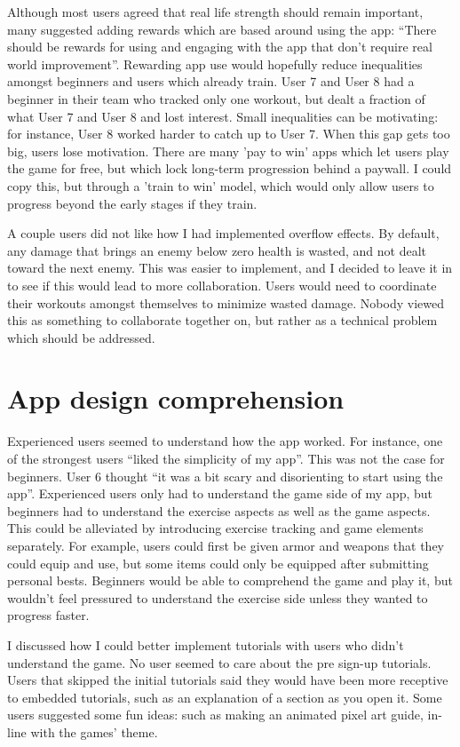 \documentclass{l4proj}
\begin{document}
Although most users agreed that real life strength should remain important, many suggested adding rewards which are based around using the app: ``There should be rewards for using and engaging with the app that don't require real world improvement''. Rewarding app use would hopefully reduce inequalities amongst beginners and users which already train.  User 7 and User 8 had a beginner in their team who tracked only one workout, but dealt a fraction of what User 7 and User 8 and lost interest. Small inequalities can be motivating: for instance, User 8 worked harder to catch up to User 7. When this gap gets too big, users lose motivation. There are many 'pay to win' apps which let users play the game for free, but which lock long-term progression behind a paywall. I could copy this, but through a 'train to win' model, which would only allow users to progress beyond the early stages if they train. 

A couple users did not like how I had implemented overflow effects. By default, any damage that brings an enemy below zero health is wasted, and not dealt toward the next enemy. This was easier to implement, and I decided to leave it in to see if this would lead to more collaboration. Users would need to coordinate their workouts amongst themselves to minimize wasted damage. Nobody viewed this as something to collaborate together on, but rather as a technical problem which should be addressed.

\section{App design comprehension}
Experienced users seemed to understand how the app worked. For instance, one of the strongest users ``liked the simplicity of my app''. This was not the case for beginners. User 6 thought ``it was a bit scary and disorienting to start using the app''. Experienced users only had to understand the game side of my app, but beginners had to understand the exercise aspects as well as the game aspects. This could be alleviated by introducing exercise tracking and game elements separately. For example, users could first be given armor and weapons that they could equip and use, but some items could only be equipped after submitting personal bests. Beginners would be able to comprehend the game and play it, but wouldn't feel pressured to understand the exercise side unless they wanted to progress faster. 

I discussed how I could better implement tutorials with users who didn't understand the game. No user seemed to care about the pre sign-up tutorials. Users that skipped the initial tutorials said they would have been more receptive to embedded tutorials, such as an explanation of a section as you open it. Some users suggested some fun ideas: such as making an animated pixel art guide, in-line with the games' theme.
\end{document}
